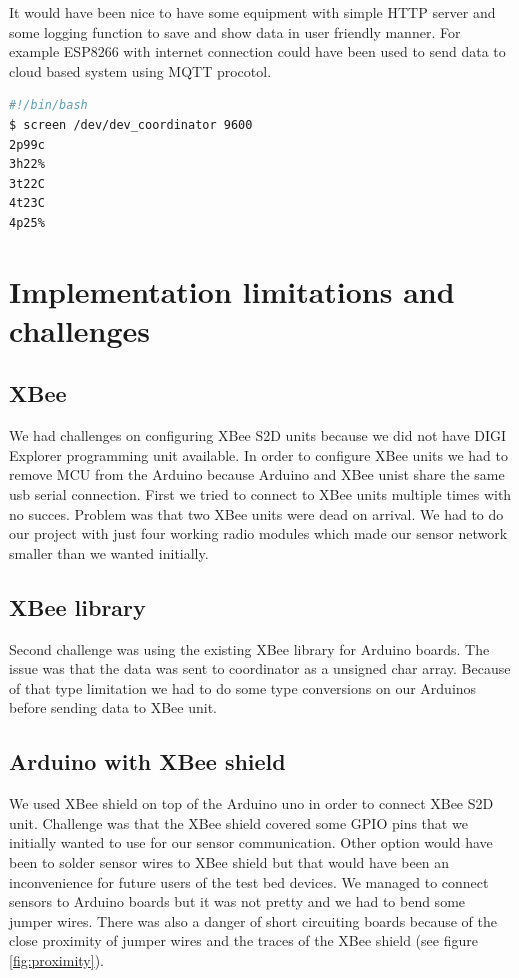 It would have been nice to have some equipment with simple HTTP server and some logging function to save and show data in user friendly manner. For example ESP8266 with internet connection could have been used to send data to cloud based system using MQTT procotol. 

\begin{lstlisting}[language=bash, caption=User console, label=console]
#!/bin/bash
$ screen /dev/dev_coordinator 9600 
2p99c
3h22%
3t22C
4t23C
4p25%
\end{lstlisting}




\chapter{Implementation limitations and challenges}

\section{XBee}
We had challenges on configuring XBee S2D units because we did not have DIGI Explorer programming unit available. In order to configure XBee units we had to remove MCU from the Arduino because Arduino and XBee unist share the same usb serial connection. First we tried to connect to XBee units multiple times with no succes. Problem was that two XBee units were dead on arrival. We had to do our project with just four working radio modules which made our sensor network smaller than we wanted initially. 

\section{XBee library}
Second challenge was using the existing XBee library for Arduino boards. The issue was that the data was sent to coordinator as a unsigned char array. Because of that type limitation we had to do some type conversions on our Arduinos before sending data to XBee unit.

\section{Arduino with XBee shield}
We used XBee shield on top of the Arduino uno in order to connect XBee S2D unit. Challenge was that the XBee shield covered some GPIO pins that we initially wanted to use for our sensor communication. Other option would have been to solder sensor wires to XBee shield but that would have been an inconvenience for future users of the test bed devices. We managed to connect sensors to Arduino boards but it was not pretty and we had to bend some jumper wires. There was also a danger of short circuiting boards because of the close proximity of jumper wires and the traces of the XBee shield (see figure \ref{fig:proximity}).

